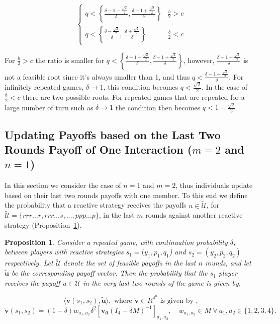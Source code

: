 \documentclass[11pt]{article}
\theoremstyle{plainCl1}
\newtheorem{Prop}{Proposition}
\theoremstyle{plainCl2}
\begin{document}
\begin{equation}
\begin{cases}
  q < \left\{\frac{\delta - 1 - \frac{\sqrt{2}}{2}}{\delta}, \frac{\delta - 1 + \frac{\sqrt{2}}{2}}{\delta}\right\}  & \frac{b}{2} > c \\[0.5cm]
  q < \left\{\frac{\delta - \frac{\sqrt{2}}{2}}{\delta}, \  \frac{\delta + \frac{\sqrt{2}}{2}}{\delta}\right\} & \frac{b}{2} < c
\end{cases}
\end{equation}

For \(\frac{b}{2}>c\) the ratio is smaller for \(q < \left\{\frac{\delta - 1 -
\frac{\sqrt{2}}{2}}{\delta}, \frac{\delta - 1 +
\frac{\sqrt{2}}{2}}{\delta}\right\}\), however, \(\frac{\delta - 1 -
\frac{\sqrt{2}}{2}}{\delta}\) is not a feasible root since it's always smaller
than 1, and thus \(q < \frac{\delta - 1 + \frac{\sqrt{2}}{2}}{\delta}\). For
infinitely repeated games, \(\delta \rightarrow 1\), this condition becomes \(q
< \frac{\sqrt{2}}{2}\). In the case of \(\frac{b}{2}<c\) there are two possible
roots. For repeated games that are repeated for a large number of turn such as
\(\delta \rightarrow 1\) the condition then becomes \(q < 1 -
\frac{\sqrt{2}}{2}\).

\subsection{Updating Payoffs based on the Last Two Rounds Payoff of One Interaction (\(m=2\) and \(n=1\))}\label{section:m_two_n_one}

In this section we consider the case of \(n=1\) and \(m=2\), thus individuals
update based on their last two rounds payoffs with one member. To this end we
define the probability that a reactive strategy receives the payoffs $u\!\in\!
\mathcal{\tilde{U}}$, for \(\mathcal{\tilde{U}}= \{rrr\dots r, rrr\dots s, \dots,
ppp\dots p\}\), in the last \(m\) rounds against another reactive strategy
(Proposition~\ref{proposition:last_m_rounds}).

\begin{Prop}\label{proposition:last_m_rounds} Consider a repeated game, with
  continuation probability $\delta$, between players with reactive strategies
  $s_1\!=\!(y_1, p_1, q_1$) and $s_2\!=\!(y_2,p_2,q_2)$ respectively. Let
  $\mathcal{\tilde{U}}$ denote the set of feasible payoffs in the last
  \(n\) rounds, and let \(\tilde{\mathbf{u}}\) be the corresponding payoff vector.
  Then the probability that the $s_1$ player receives the payoff $u\!\in\!
  \mathcal{\tilde{U}}$ in the very last two rounds of the game is given by,

  \begin{equation}
  \langle\mathbf{\tilde{v}}(s_1,s_2),\mathbf{\tilde{u}}\rangle, \text{ where } \mathbf{\tilde{v}} \in R^{4^{n}} \text{ is given by },
  \end{equation}
  \begin{equation}
    \mathbf{\tilde{v}}(s_1,s_2) = (1 - \delta) w_{a_1, a_2} \delta^2 \left[\mathbf{v_0}(I_4 - \delta M)^{-1}\right]_{a_1, a_2}, \quad  w_{a_1, a_2} \in M \ \forall \ a_1, a_2 \in \{1, 2, 3, 4\}.
  \end{equation}
\end{Prop}
\end{document}
